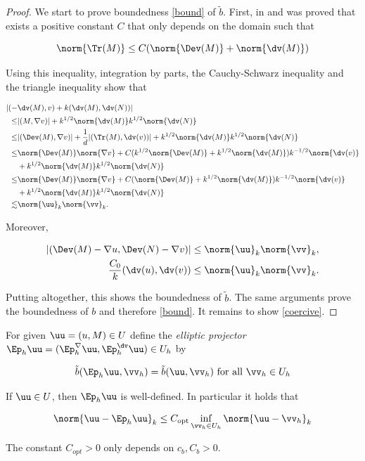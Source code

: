 \begin{proof}
  We start to prove boundedness \eqref{bound} of $\tilde{b}$.  First, in \cite{arnold1984family} and \cite{cai2003first} was proved that exists a positive constant $C$ that only depends on the domain such that

  $$\norm{\Tr(M)}\leq C(\norm{\Dev(M)}+\norm{\dv(M)})$$

  Using this inequality, integration by parts, the Cauchy-Schwarz inequality and the triangle inequality show that

  \begin{align*}
      |(-&\dv(M),v)+k(\dv(M),\dv(N))|\\\leq& |(M,\nabla v)|+k^{1/2}\norm{\dv(M)}k^{1/2}\norm{\dv(N)}\\
      \leq &|(\Dev(M),\nabla v)|+\frac{1}{d}|(\Tr(M),\dv(v))|+k^{1/2}\norm{\dv(M)}k^{1/2}\norm{\dv(N)}\\
      \leq&\norm{\Dev(M)}\norm{\nabla v}+C(k^{1/2}\norm{\Dev(M)}+k^{1/2}\norm{\dv(M)})k^{-1/2}\norm{\dv(v)}\\&+k^{1/2}\norm{\dv(M)}k^{1/2}\norm{\dv(N)}\\
      \leq&\norm{\Dev(M)}\norm{\nabla v}+C(\norm{\Dev(M)}+k^{1/2}\norm{\dv(M)})k^{-1/2}\norm{\dv(v)}\\&+k^{1/2}\norm{\dv(M)}k^{1/2}\norm{\dv(N)}\\
      \lesssim &\norm{\uu}_k\norm{\vv}_k.
  \end{align*}

  Moreover,

\begin{align*}
    |(\Dev(M)-\nabla u,\Dev(N)-\nabla v)|&\leq \norm{\uu}_k\norm{\vv}_k,\\
    \frac{C_0}{k}(\dv(u),\dv(v))&\leq\norm{\uu}_k\norm{\vv}_k.
\end{align*}

  Putting altogether, this shows the boundedness of $\tilde{b}$. The same arguments prove the boundedness of $b$ and therefore \eqref{bound}. It remains to show \eqref{coercive}.
\end{proof}

For given $\uu=(u,M)\in U$ define the \textit{elliptic projector} $\Ep_h\uu=(\Ep_h^{\nabla}\uu,\Ep_h^{\dv}\uu)\in U_h$ by

\begin{equation}
    \tilde{b}(\Ep_h\uu,\vv_h)=\tilde{b}(\uu,\vv_h) \text{ for all }\vv_h\in U_h
\end{equation}

\begin{teor}
    If $\uu\in U$, then $\Ep_h\uu$ is well-defined. In particular it holds that

    \begin{equation}
        \norm{\uu-\Ep_h\uu}_k\leq C_{\text{opt}}\inf_{\vv_h\in U_h}\norm{\uu-\vv_h}_k
    \end{equation}

    The constant $C_{opt}>0$ only depends on $c_b,C_b>0$.
\end{teor}


